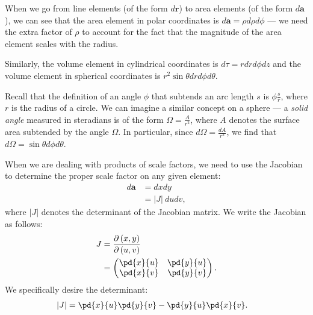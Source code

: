 \documentclass[10pt]{mypackage}
\begin{document}
When we go from line elements (of the form $d\mathbf{r}$) to area elements (of the form $d \mathbf{a}$), we can see that the area element in polar coordinates is $d \mathbf{a} = \rho d\rho d\phi$ --- we need the extra factor of $\rho$ to account for the fact that the magnitude of the area element scales with the radius.\newline

Similarly, the volume element in cylindrical coordinates is $d\tau = r dr d\phi dz$ and the volume element in spherical coordinates is $r^2 \sin \theta dr d\phi d\theta$.\newline

Recall that the definition of an angle $\phi$ that subtends an arc length $s$ is $\phi \frac{s}{r}$, where $r$ is the radius of a circle. We can imagine a similar concept on a sphere --- a \textit{solid angle} measured in steradians is of the form $\Omega = \frac{A}{r^2}$, where $A$ denotes the surface area subtended by the angle $\Omega$. In particular, since $d\Omega = \frac{dA}{r^2}$, we find that $d\Omega = \sin\theta d\phi d\theta$.\newline

When we are dealing with products of scale factors, we need to use the Jacobian to determine the proper scale factor on any given element:
\begin{align*}
  d\mathbf{a} &= dx dy\\
              &= \left\vert J \right\vert \:du dv,
\end{align*}
where $|J|$ denotes the determinant of the Jacobian matrix. We write the Jacobian as follows:
\begin{align*}
  J &= \frac{\partial \left(x,y\right)}{\partial \left(u,v\right)}\\
    &= \begin{pmatrix}\pd{x}{u} & \pd{y}{u}\\ \pd{x}{v} & \pd{y}{v}\end{pmatrix}.
\end{align*}
We specifically desire the determinant:
\begin{align*}
  |J| &= \pd{x}{u}\pd{y}{v} - \pd{y}{u}\pd{x}{v}.
\end{align*}
\end{document}
